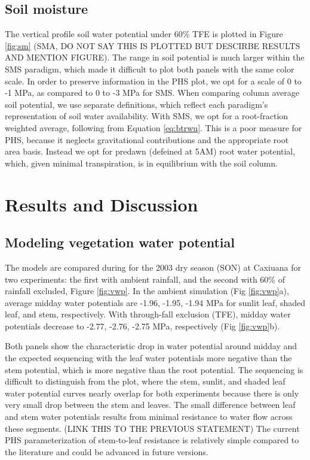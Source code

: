 \documentclass[draft,linenumbers]{agujournal}
\begin{document}
\subsection{Soil moisture}
    The vertical profile soil water potential under 60\% TFE is plotted in Figure \ref{fig:sm} (SMA, DO NOT SAY THIS IS PLOTTED BUT DESCIRBE RESULTS AND MENTION FIGURE).
    The range in soil potential is much larger within the SMS paradigm, which made it difficult to plot both panels with the same color scale.
    In order to preserve information in the PHS plot, we opt for a scale of 0 to -1 MPa, as compared to 0 to -3 MPa for SMS.
    When comparing column average soil potential, we use separate definitions, which reflect each paradigm's representation of soil water availability.
    With SMS, we opt for a root-fraction weighted average, following from Equation \ref{eq:btrwu}.
    This is a poor measure for PHS, because it neglects gravitational contributions and the appropriate root area basis. 
    Instead we opt for predawn (defeined at 5AM) root water potential, which, given minimal transpiration, is in equilibrium with the soil column. 
    
\section{Results and Discussion}
\subsection{Modeling vegetation water potential}
    
    The models are compared during for the 2003 dry season (SON)
    at Caxiuana for two experiments: the first with ambient rainfall, and the second with 60\% of rainfall excluded, Figure \ref{fig:vwp}. 
    In the ambient simulation (Fig \ref{fig:vwp}a), average midday water potentials are -1.96, -1.95, -1.94 MPa for sunlit leaf, shaded leaf, and stem, respectively.
    With through-fall exclusion (TFE), midday water potentials decrease to -2.77, -2.76, -2.75 MPa, respectively (Fig \ref{fig:vwp}b).
    
    Both panels show the characteristic drop in water potential around midday and the expected sequencing with 
    the leaf water potentials more negative than the stem potential, which is more negative than the root potential.
    The sequencing is difficult to distinguish from the plot, where the stem, sunlit, and shaded leaf water potential curves nearly overlap for both experiments because there is only very small drop between the stem and leaves. 
    The small difference between leaf and stem water potentials results from minimal resistance to water flow across these segments. 
    (LINK THIS TO THE PREVIOUS STATEMENT) The current PHS parameterization of stem-to-leaf resistance is relatively simple compared to the literature \citep{franks2007} and could be advanced in future versions. 
    
\end{document}
